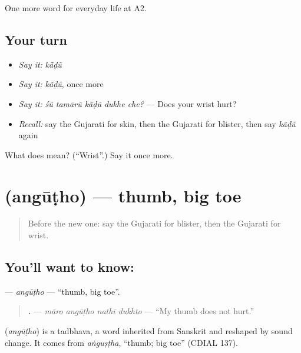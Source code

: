 \begin{grammarlens}[title={What you've built}]
One more word for everyday life at A2.
\end{grammarlens}

\subsection*{Your turn}
\begin{itemize}
\raggedright
  \item \emph{Say it:} \emph{kā̃ḍũ}
  \item \emph{Say it:} \emph{kā̃ḍũ}, once more
  \item \emph{Say it:} \emph{śũ tamārũ kā̃ḍũ dukhe che?} — Does your wrist hurt?
  \item \emph{Recall:} say the Gujarati for skin, then the Gujarati for blister, then say \emph{kā̃ḍũ} again
\end{itemize}

\begin{tcolorbox}[breakable,colback=teal!4,colframe=teal!35!black,title={Before you move on}]
What does  mean? (\textquotedblleft{}Wrist\textquotedblright{}.) Say it once more.
\end{tcolorbox}
\section[\texorpdfstring{\gu{અંગૂઠો} (angūṭho)}{અંગૂઠો (angūṭho)}]{ (angūṭho) — thumb, big toe}

\label{lesson:GU-C229-angutho}



\begin{quote}
Before the new one: say the Gujarati for blister, then the Gujarati for wrist.
\end{quote}

\subsection*{You'll want to know: }
\textbf{} — \emph{angūṭho} — \textquotedblleft{}thumb, big toe\textquotedblright{}.

\begin{quote}
\textbf{   .} — \emph{māro angūṭho nathī dukhto} — \textquotedblleft{}My thumb does not hurt.\textquotedblright{}
\end{quote}

\begin{cousinweb}
\textbf{} (\emph{angūṭho}) is a tadbhava, a word inherited from Sanskrit and reshaped by sound change. It comes from \emph{aṅguṣṭha}, \textquotedblleft{}thumb; big toe\textquotedblright{} (CDIAL 137).
\end{cousinweb}

